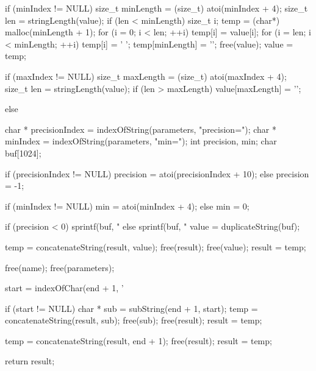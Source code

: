 \begin{csourcecorrection}
{{{{{{                        if (minIndex != NULL) {
                            size_t minLength = (size_t) atoi(minIndex + 4);
                            size_t len = stringLength(value);
                            if (len < minLength) {
                                size_t i;
                                temp = (char*) malloc(minLength + 1);
                                for (i = 0; i < len; ++i)
                                    temp[i] = value[i];
                                for (i = len; i < minLength; ++i)
                                    temp[i] = ' ';
                                temp[minLength] = '\0';
                                free(value);
                                value = temp;
                            }
                        }

                        if (maxIndex != NULL) {
                            size_t maxLength = (size_t) atoi(maxIndex + 4);
                            size_t len = stringLength(value);
                            if (len > maxLength)
                                value[maxLength] = '\0';
                        }
                    } else {
                        char * precisionIndex = indexOfString(parameters, "precision=");
                        char * minIndex = indexOfString(parameters, "min=");
                        int precision, min;
                        char buf[1024];

                        if (precisionIndex != NULL)
                            precision = atoi(precisionIndex + 10);
                        else
                            precision = -1;

                        if (minIndex != NULL)
                            min = atoi(minIndex + 4);
                        else
                            min = 0;

                        if (precision < 0)
                            sprintf(buf, "%
                        else
                            sprintf(buf, "%
                        value = duplicateString(buf);
                    }

                    temp = concatenateString(result, value);
                    free(result);
                    free(value);
                    result = temp;
                }
                free(name);
                free(parameters);
            }
            start = indexOfChar(end + 1, '%

            if (start != NULL) {
                char * sub = subString(end + 1, start);
                temp = concatenateString(result, sub);
                free(sub);
                free(result);
                result = temp;
            }
        }

        temp = concatenateString(result, end + 1);
        free(result);
        result = temp;
    }

    return result;
}
\end{csourcecorrection}



